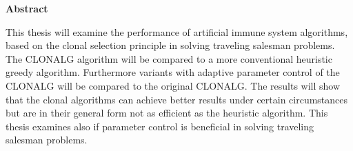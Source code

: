 %
%
% 
% 
% 



\cleardoublepage


\begin{center}
{\Large\bfseries Abstract}
\end{center}

This thesis will examine the performance of artificial immune system algorithms, based on the clonal selection principle in solving traveling salesman problems. The CLONALG algorithm will be compared to a more conventional heuristic greedy algorithm. Furthermore variants with adaptive parameter control of the CLONALG will be compared to the original CLONALG. The results will show that the clonal algorithms can achieve better results under certain circumstances but are in their general form not as efficient as the heuristic algorithm. This thesis examines also if parameter control is beneficial in solving traveling salesman problems. 


